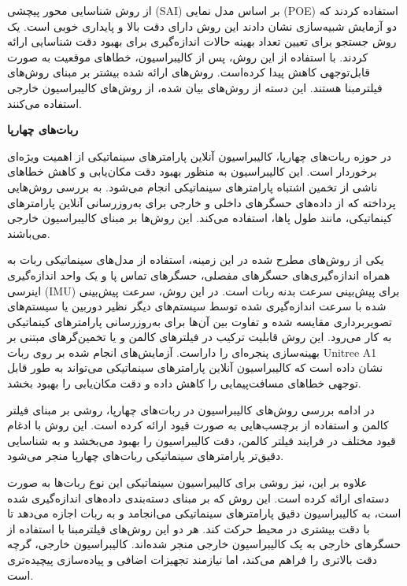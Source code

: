  \cite{wang2012screw} از روش شناسایی محور پیچشی (SAI) بر اساس مدل نمایی (POE) استفاده کردند که دو آزمایش شبیه‌سازی نشان دادند این روش دارای دقت بالا و پایداری خوبی است. \cite{li2011optimal} یک روش جستجو برای تعیین تعداد بهینه حالات اندازه‌گیری برای بهبود دقت شناسایی ارائه کردند. با استفاده از این روش، پس از کالیبراسیون، خطاهای موقعیت به صورت قابل‌توجهی کاهش پیدا کرده‌است. روش‌های ارائه شده بیشتر بر مبنای روش‌های فیلتر‌مبنا هستند. این دسته از روش‌های بیان شده، از روش‌های کالیبراسیون خارجی استفاده می‌کنند.
 
 \textbf{ربات‌های چهارپا}
 
در حوزه ربات‌های چهارپا، کالیبراسیون آنلاین پارامترهای سینماتیکی از اهمیت ویژه‌ای برخوردار است. این کالیبراسیون به منظور بهبود دقت مکان‌یابی و کاهش خطاهای ناشی از تخمین اشتباه پارامترهای سینماتیکی انجام می‌شود. 
\cite{yang2022online}
 به بررسی روش‌هایی پرداخته که از داده‌های حسگرهای داخلی و خارجی برای به‌روزرسانی آنلاین پارامترهای کینماتیکی، مانند طول پاها، استفاده می‌کند. این روش‌ها بر مبنای کالیبراسیون خارجی می‌باشند. 
 
 یکی از روش‌های مطرح شده در این زمینه، استفاده از مدل‌های سینماتیکی ربات به همراه اندازه‌گیری‌های حسگرهای مفصلی، حسگرهای تماس پا و یک واحد اندازه‌گیری اینرسی (IMU) برای پیش‌بینی سرعت بدنه ربات است. در این روش، سرعت پیش‌بینی شده با سرعت اندازه‌گیری شده توسط سیستم‌های دیگر نظیر دوربین یا سیستم‌های تصویربرداری مقایسه شده و تفاوت بین آن‌ها برای به‌روزرسانی پارامترهای کینماتیکی به کار می‌رود. این روش قابلیت ترکیب در فیلترهای کالمن و یا تخمین‌گرهای مبتنی بر بهینه‌سازی پنجره‌ای را داراست. آزمایش‌های انجام شده بر روی ربات Unitree A1 نشان داده است که کالیبراسیون آنلاین پارامترهای سینماتیکی می‌تواند به طور قابل توجهی خطاهای مسافت‌پیمایی را کاهش داده و دقت مکان‌یابی را بهبود بخشد.
 
 در ادامه بررسی روش‌های کالیبراسیون در ربات‌های چهارپا، \cite{blochliger2017foot} روشی بر مبنای فیلتر کالمن و استفاده از برچسب‌هایی به صورت قیود ارائه کرده است. این روش با ادغام قیود مختلف در فرایند فیلتر کالمن، دقت کالیبراسیون را بهبود می‌بخشد و به شناسایی دقیق‌تر پارامترهای سینماتیکی ربات‌های چهارپا منجر می‌شود. 
 
 علاوه بر این، \cite{bloesch2013kinematic} نیز روشی برای کالیبراسیون سینماتیکی این نوع ربات‌ها به صورت دسته‌ای ارائه کرده است. این روش که بر مبنای دسته‌بندی داده‌های اندازه‌گیری شده است، به کالیبراسیون دقیق پارامترهای سینماتیکی می‌انجامد و به ربات اجازه می‌دهد تا با دقت بیشتری در محیط حرکت کند.  هر دو این روش‌های فیلتر‌مبنا با استفاده از حسگرهای خارجی به یک کالیبراسیون خارجی منجر شده‌اند. کالیبراسیون خارجی، گرچه دقت بالاتری را فراهم می‌کند، اما نیازمند تجهیزات اضافی و پیاده‌سازی پیچیده‌تری است.
 
